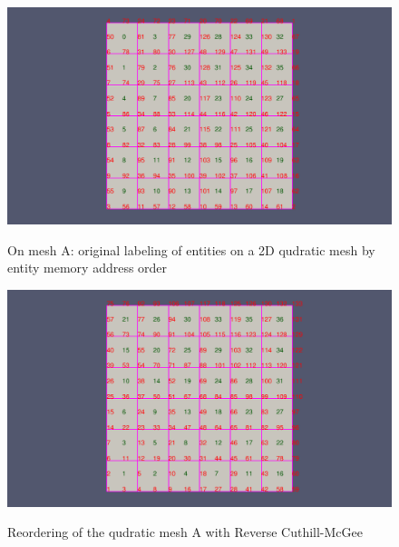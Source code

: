 \documentclass{article}
\begin{document}
\begin{figure}[ht]
\caption{On mesh A: original labeling of entities on a 2D qudratic mesh by entity memory address order}
{\includegraphics[width = 15cm ]{pre_a}}
\centering
\end{figure}

\begin{figure}[h]
\caption{Reordering of the qudratic mesh A with Reverse Cuthill-McGee}
{\includegraphics[width = 15cm ]{post_a}}
\centering
\end{figure}
\end{document}
